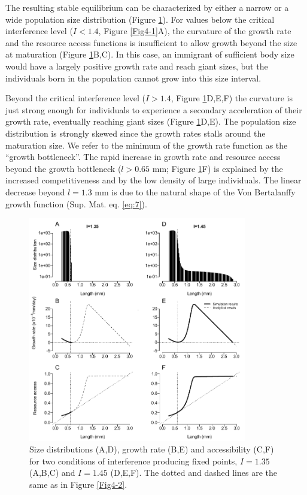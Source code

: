 The resulting stable equilibrium can be characterized by either a narrow or a
wide population size distribution (Figure \ref{Fig4-3}). For values below the
critical interference level ($I<1.4$, Figure \ref{Fig4-1}A), the curvature of
the growth rate and the resource access functions is insufficient to allow
growth beyond the size at maturation (Figure \ref{Fig4-3}B,C). In this case, an
immigrant of sufficient body size would have a largely positive growth rate and
reach giant sizes, but the individuals born in the population cannot grow into
this size interval.

Beyond the critical interference level ($I>1.4$, Figure \ref{Fig4-3}D,E,F) the
curvature is just strong enough for individuals to experience a secondary
acceleration of their growth rate, eventually reaching giant sizes (Figure
\ref{Fig4-3}D,E). The population size distribution is strongly skewed since the
growth rates stalls around the maturation size. We refer to the minimum of the
growth rate function as the “growth bottleneck”. The rapid increase in growth
rate and resource access beyond the growth bottleneck ($l>0.65$ mm; Figure
\ref{Fig4-3}F) is explained by the increased competitiveness and by the low
density of large individuals. The linear decrease beyond $l=1.3$ mm is due to
the natural shape of the Von Bertalanffy growth function (Sup. Mat.
eq. \eqref{eq:7}).

\begin{figure}[!ht] %
\centering
\includegraphics[width=0.85\textwidth]{4_ChapThe1/Fig/Fig3.pdf} 
\caption[Sample dynamics for $I=1.35$ and
$I=1.45$]{Size distributions (A,D), growth rate (B,E) and accessibility (C,F)
for two conditions of interference producing fixed points, $I=1.35$ (A,B,C) and
$I=1.45$ (D,E,F). The dotted and dashed lines are the same as in Figure
\ref{Fig4-2}.}
\label{Fig4-3}
\end{figure}

